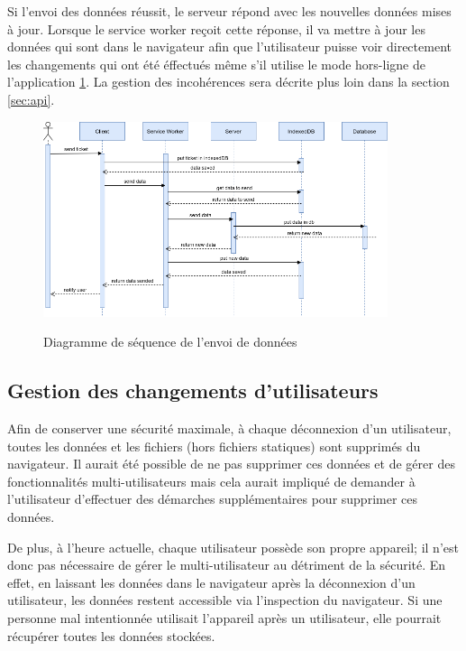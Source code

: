 \documentclass{EPL-master-thesis-covers-FR}
\begin{document}
					Si l'envoi des données réussit, le serveur répond avec les nouvelles données mises à jour. Lorsque le service worker reçoit cette réponse, il va mettre à jour les données qui sont dans le navigateur afin que l'utilisateur puisse voir directement les changements qui ont été éffectués même s'il utilise le mode hors-ligne de l'application \ref{fig:flows2}. La gestion des incohérences sera décrite plus loin dans la section \ref{sec:api}.
					
					\begin{figure}[H]
						\centering
						\includegraphics[width=0.9\textwidth]{images/flow2}
						\label{fig:flows2}
						\caption{Diagramme de séquence de l'envoi de données}
					\end{figure}
			
			\subsection*{Gestion des changements d'utilisateurs}		
				Afin de conserver une sécurité maximale, à chaque déconnexion d'un utilisateur, toutes les données et les fichiers (hors fichiers statiques) sont supprimés du navigateur. Il aurait été possible de ne pas supprimer ces données et de gérer des fonctionnalités multi-utilisateurs mais cela aurait impliqué de demander à l'utilisateur d'effectuer des démarches supplémentaires pour supprimer ces données. 
			
				De plus, à l'heure actuelle, chaque utilisateur possède son propre appareil; il n'est donc pas nécessaire de gérer le multi-utilisateur au détriment de la sécurité. En effet, en laissant les données dans le navigateur après la déconnexion d'un utilisateur, les données restent accessible via l'inspection du navigateur. Si une personne mal intentionnée utilisait l'appareil après un utilisateur, elle pourrait récupérer toutes les données stockées. 
				
\end{document}
